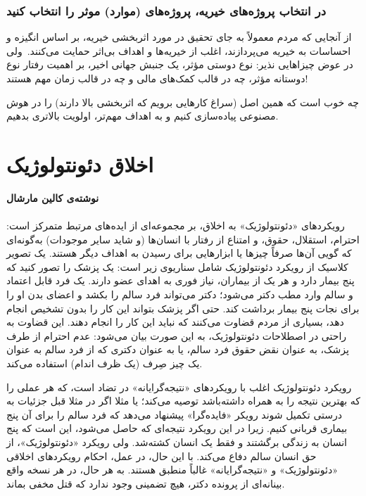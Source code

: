 \subsubsection*{در انتخاب پروژه‌های خیریه، پروژه‌های (موارد) موثر را انتخاب کنید}
\label{subsubsec:در انتخاب پروژه‌های خیریه، پروژه‌های (موارد) موثر را انتخاب کنید}
از آنجایی که مردم معمولاً به جای تحقیق در مورد اثربخشی خیریه، بر اساس انگیزه و احساسات به خیریه می‌پردازند، اغلب از خیریه‌ها و اهداف بی‌اثر حمایت می‌کنند.\     ولی در عوض چیزاهایی نذیر: نوع دوستی مؤثر، یک جنبش جهانی اخیر، بر اهمیت رفتار نوع دوستانه مؤثر، چه در قالب کمک‌های مالی و چه در قالب زمان مهم هستند!

چه خوب است که همین اصل (سراغ کارهایی برویم که اثربخشی بالا دارند) را در هوش مصنوعی پیاده‌سازی کنیم و به اهداف مهم‌تر، اولویت بالاتری بدهیم.


\section*{اخلاق دئونتولوژیک}
\label{sec:اخلاق دئونتولوژیک}
\textbf{نوشته‌ی کالین مارشال}
\paragraph{}
رویکردهای «دئونتولوژیک» به اخلاق، بر مجموعه‌ای از ایده‌های مرتبط متمرکز است: احترام، استقلال، حقوق، و امتناع از رفتار با انسان‌ها (و شاید سایر موجودات) به‌گونه‌ای که گویی آن‌ها صرفاً چیزها یا ابزارهایی برای رسیدن به اهداف دیگر هستند.
یک تصویر کلاسیک از رویکرد دئونتولوژیک شامل سناریوی زیر است: یک پزشک را تصور کنید که پنج بیمار دارد و هر یک از بیماران، نیاز فوری به اهدای عضو دارند.
یک فرد قابل اعتماد و سالم وارد مطب دکتر می‌شود؛ دکتر می‌تواند فرد سالم را بکشد و اعضای بدن او را برای نجات پنج بیمار برداشت کند.
حتی اگر پزشک بتواند این کار را بدون تشخیص انجام دهد، بسیاری از مردم قضاوت می‌کنند که نباید این کار را انجام دهند.
این قضاوت به راحتی در اصطلاحات دئونتولوژیک، به این صورت بیان می‌شود: عدم احترام از طرف پزشک، به عنوان نقض حقوق فرد سالم، یا به عنوان دکتری که از فرد سالم به عنوان یک چیز صِرف (یک ظرف اندام) استفاده می‌کند.

رویکرد دئونتولوژیک اغلب با رویکردهای «نتیجه‌گرایانه» در تضاد است، که هر عملی را که بهترین نتیجه را به همراه داشته‌باشد توصیه می‌کند؛ یا مثلا اگر در مثلا قبل جزئیات به درستی تکمیل شوند رویکر «فایده‌گرا» پیشنهاد می‌دهد که فرد سالم را برای آن پنج بیماری قربانی کنیم.
زیرا در این رویکرد نتیجه‌ای که حاصل می‌شود، این است که پنج انسان به زندگی برگشتند و فقط یک انسان کشته‌شد.
ولی رویکرد «دئونتولوژیک»، از حق انسان سالم دفاع می‌کند.
با این حال، در عمل، احکام رویکردهای اخلاقی «دئونتولوژیک» و «نتیجه‌گرایانه» غالباً منطبق هستند.
به هر حال، در هر نسخه واقع بینانه‌ای از پرونده دکتر، هیچ تضمینی وجود ندارد که قتل مخفی بماند.

